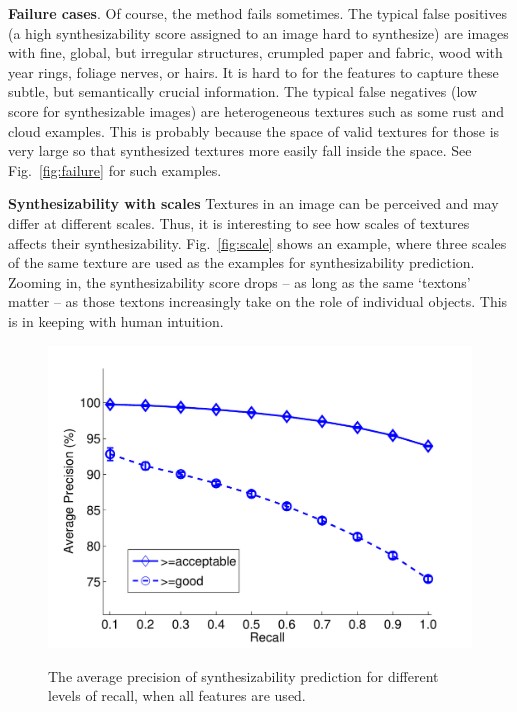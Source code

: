\documentclass[10pt,twocolumn,letterpaper]{article}
\begin{document}

\textbf{Failure cases}. Of course, the method fails sometimes.  The
typical false positives (a high synthesizability score assigned to an
image hard to synthesize) are images with fine, global, but irregular
structures, \eg crumpled paper and fabric, wood with year rings,
foliage nerves, or hairs.  It is hard to for the features to capture
these subtle, but semantically crucial information. The typical false
negatives (low score for synthesizable images) are heterogeneous
textures such as some rust and cloud examples.  This is probably
because the space of valid textures for those is very large so that
synthesized textures more easily fall inside the space. See
Fig.~\ref{fig:failure} for such examples.

\textbf{Synthesizability with scales} Textures in an image can be
perceived and may differ at different scales. Thus, it is interesting
to see how scales of textures affects their
synthesizability. Fig.~\ref{fig:scale} shows an example, where three
scales of the same texture are used as the examples for
synthesizability prediction. Zooming in, the synthesizability score
drops -- as long as the same `textons' matter -- as those textons 
increasingly take on the role of individual objects. This is in keeping with
human intuition. 



\begin{figure} 
 \centering
\includegraphics[width=0.8\linewidth]{./figs/AP_curve_all.pdf} \\ 
\caption{The average precision of synthesizability prediction for different levels of recall, when all features are used. }
  \label{fig:curve}
\end{figure}
\end{document}
